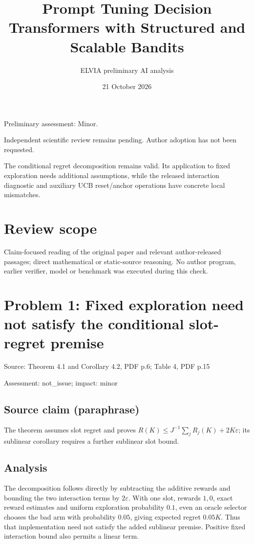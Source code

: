 \documentclass[11pt]{article}
\begin{document}
\title{Prompt Tuning Decision Transformers with Structured and Scalable Bandits}

\author{ELVIA preliminary AI analysis}\date{21 October 2026}\maketitle

Preliminary assessment: Minor.\par

Independent scientific review remains pending. Author adoption has not been requested.

The conditional regret decomposition remains valid. Its application to fixed exploration needs additional assumptions, while the released interaction diagnostic and auxiliary UCB reset/anchor operations have concrete local mismatches.

\section*{Review scope}

Claim-focused reading of the original paper and relevant author-released passages; direct mathematical or static-source reasoning. No author program, earlier verifier, model or benchmark was executed during this check.

\section*{Problem 1: Fixed exploration need not satisfy the conditional slot-regret premise}

Source: Theorem 4.1 and Corollary 4.2, PDF p.6; Table 4, PDF p.15

Assessment: not\_issue; impact: minor

\subsection*{Source claim (paraphrase)}

The theorem assumes slot regret and proves \(R(K)\le J^{-1}\sum_jR_j(K)+2K\varepsilon\); its sublinear corollary requires a further sublinear slot bound.

\subsection*{Analysis}

The decomposition follows directly by subtracting the additive rewards and bounding the two interaction terms by \(2\varepsilon\). With one slot, rewards \(1,0\), exact reward estimates and uniform exploration probability \(0.1\), even an oracle selector chooses the bad arm with probability \(0.05\), giving expected regret \(0.05K\). Thus that implementation need not satisfy the added sublinear premise. Positive fixed interaction bound also permits a linear term.
\end{document}
